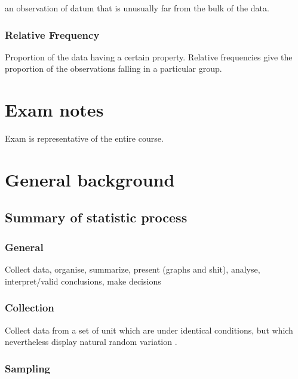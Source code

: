 \documentclass[]{article}
\begin{document}
an observation of datum that is unusually far from the bulk of the data.

\hypertarget{relative-frequency}{%
\subsubsection{Relative Frequency}\label{relative-frequency}}

Proportion of the data having a certain property. Relative frequencies
give the proportion of the observations falling in a particular group.

\hypertarget{exam-notes}{%
\section{Exam notes}\label{exam-notes}}

Exam is representative of the entire course.

\hypertarget{general-background}{%
\section{General background}\label{general-background}}

\hypertarget{summary-of-statistic-process}{%
\subsection{Summary of statistic
process}\label{summary-of-statistic-process}}

\hypertarget{general}{%
\subsubsection{General}\label{general}}

Collect data, organise, summarize, present (graphs and shit), analyse,
interpret/valid conclusions, make decisions

\hypertarget{collection}{%
\subsubsection{Collection}\label{collection}}

Collect data from a set of unit which are under identical conditions,
but which nevertheless display natural random variation .

\hypertarget{sampling}{%
\subsubsection{Sampling}\label{sampling}}
\end{document}
